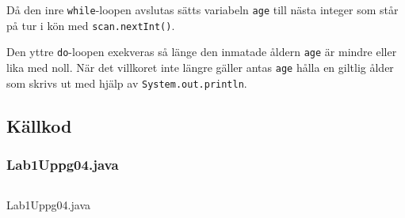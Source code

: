 Då den inre \texttt{while}-loopen avslutas sätts variabeln \texttt{age} till 
nästa integer som står på tur i kön med \texttt{scan.nextInt()}.
\par Den yttre \texttt{do}-loopen exekveras så länge den inmatade åldern \texttt{age}
är mindre eller lika med noll. När det villkoret inte längre gäller antas \texttt{age}
hålla en giltlig ålder som skrivs ut med hjälp av \texttt{System.out.println}.

\subsection{Källkod}\label{uppgift-4_src}
\subsubsection*{Lab1Uppg04.java}
    \inputminted[linenos]{java}{src/Lab1Uppg04.java}
    \caption{Lab1Uppg04.java}
    \label{Uppg4src}
